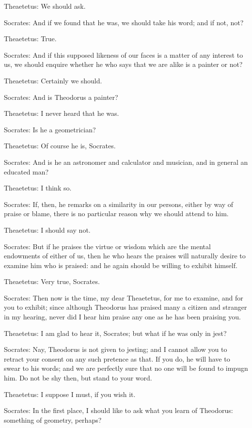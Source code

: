 Theaetetus: We should ask.

Socrates: And if we found that he was, we should take his word; and if
not, not?

Theaetetus: True.

Socrates: And if this supposed likeness of our faces is a matter of any
interest to us, we should enquire whether he who says that we are alike
is a painter or not?

Theaetetus: Certainly we should.

Socrates: And is Theodorus a painter?

Theaetetus: I never heard that he was.

Socrates: Is he a geometrician?

Theaetetus: Of course he is, Socrates.

Socrates: And is he an astronomer and calculator and musician, and in
general an educated man?

Theaetetus: I think so.

Socrates: If, then, he remarks on a similarity in our persons, either
by way of praise or blame, there is no particular reason why we should
attend to him.

Theaetetus: I should say not.

Socrates: But if he praises the virtue or wisdom which are the mental
endowments of either of us, then he who hears the praises will naturally
desire to examine him who is praised: and he again should be willing to
exhibit himself.

Theaetetus: Very true, Socrates.

Socrates: Then now is the time, my dear Theaetetus, for me to examine,
and for you to exhibit; since although Theodorus has praised many a
citizen and stranger in my hearing, never did I hear him praise any one
as he has been praising you.

Theaetetus: I am glad to hear it, Socrates; but what if he was only in
jest?

Socrates: Nay, Theodorus is not given to jesting; and I cannot allow you
to retract your consent on any such pretence as that. If you do, he will
have to swear to his words; and we are perfectly sure that no one will
be found to impugn him. Do not be shy then, but stand to your word.

Theaetetus: I suppose I must, if you wish it.

Socrates: In the first place, I should like to ask what you learn of
Theodorus: something of geometry, perhaps?

